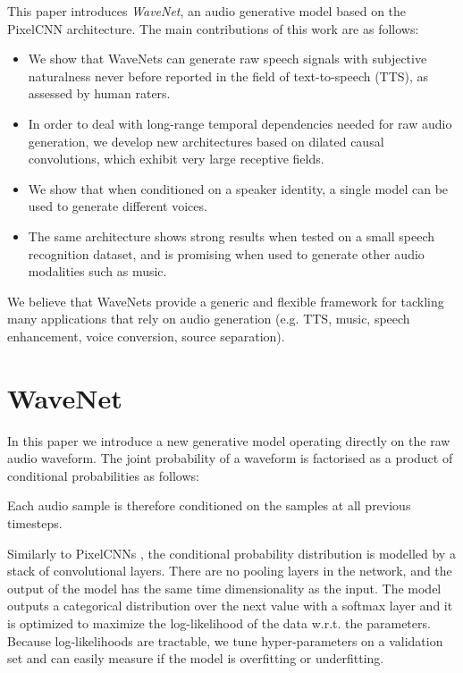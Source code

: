 \documentclass{article}
\makeatletter
\newcommand*{\eg}{e.g.\@\xspace}
\makeatother
\begin{document}
This paper introduces \emph{WaveNet}, an audio generative model based on the PixelCNN \citep{van2016pixel, ConditionalPixelCNN} architecture. The main contributions of this work are as follows:
\begin{itemize}
    \item We show that WaveNets can generate raw speech signals with subjective naturalness never before reported in the field of text-to-speech (TTS), as assessed by human raters.
    \item In order to deal with long-range temporal dependencies needed for raw audio generation, we develop new architectures based on dilated causal convolutions, which exhibit very large receptive fields.
    \item We show that when conditioned on a speaker identity, a single model can be used to generate different voices.
    \item The same architecture shows strong results when tested on a small speech recognition dataset, and is promising when used to generate other audio modalities such as music.
\end{itemize}

We believe that WaveNets provide a generic and flexible framework for tackling many applications that rely on audio generation (\eg TTS, music, speech enhancement, voice conversion, source separation).
 
\section{WaveNet}
\label{sec:wavenet}
In this paper we introduce a new generative model operating directly on the raw audio waveform.  
The joint probability of a waveform  is factorised as a product of conditional probabilities as follows:

Each audio sample  is therefore conditioned on the samples at all previous timesteps.

Similarly to PixelCNNs \citep{van2016pixel, ConditionalPixelCNN}, the conditional probability distribution is modelled by a stack of convolutional layers. There are no pooling layers in the network, and the output of the model has the same time dimensionality as the input. The model outputs a categorical distribution over the next value  with a softmax layer and it is optimized to maximize the log-likelihood of the data w.r.t. the parameters. Because log-likelihoods are tractable, we tune hyper-parameters on a validation set and can easily measure if the model is overfitting or underfitting.
\end{document}
